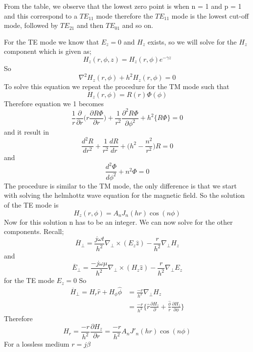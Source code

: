 From the table, we observe that the lowest zero point is when n = 1 and p = 1 and this correspond to a $TE_{11}$ mode therefore the $TE_{11}$ mode is the lowest cut-off mode, followed by $TE_{21}$ and then $TE_{01}$ and so on.

For the TE mode we know that $E_z = 0$ and $H_z$ exists, so we will solve for the $H_z$   component which is given as;
$$H_z(r,\phi,z) = H_z(r,\phi)e^{-\gamma z}$$ So \begin{equation} \nabla^2 H_z(r,\phi) +  h^2 H_z(r,\phi) = 0\end{equation}
To solve this equation we repeat the procedure for the TM mode such that 
$$H_z(r,\phi)= R(r)\Phi(\phi)$$
Therefore equation we 1 becomes
$$ \frac{1}{r}\frac{\partial}{\partial r}\bigg(r\frac{\partial R\Phi}{\partial r}\bigg) + \frac{1}{r^2}\frac{\partial^2 R\Phi}{\partial \phi^2} + h^2\{R\Phi\} = 0$$
and it result in
\begin{equation}
\dfrac{d^2 R}{dr^2} + \frac{1}{r^2}\dfrac{dR}{dr} + \bigg(h^2 - \frac{n^2}{r^2}\bigg)R = 0
\end{equation}
and 
\begin{equation}
\dfrac{d^2\Phi}{d\phi^2} + n^2\Phi = 0
\end{equation}
The procedure is similar to the TM mode, the only difference is that we start with solving  the helmhottz wave equation for the magnetic field.
So the solution of the TE mode is 
$$ H_z(r,\phi) = A_nJ_n(hr)\cos(n\phi)$$
Now for this solution n has to be an integer. We can now solve for the other components. Recall;
$$ \overline{H}_\perp = \frac{j\omega t}{h^2}\nabla_\perp\times(E_z\hat{z}) - \frac{r}{h^2}\nabla_\perp H_z$$ and
$$\overline{E}_\perp = \frac{-j\omega \mu}{h^2}\nabla_\perp\times(H_z\hat{z}) - \frac{r}{h^2}\nabla_\perp E_z$$
for the TE mode $E_z = 0$ So 
\begin{align} 
\overline{H}_\perp = H_r \hat{r} + H_\phi \hat{\phi} &= \frac{-r}{h^2}\nabla_\perp H_z\\
&= \frac{-r}{h^2}\bigg\{ 
\hat{r}\frac{\partial H_z}{\partial} + \frac{\hat{\phi}}{r} \frac{\partial H_z}{\partial \phi}   
\bigg\}
\end{align}
Therefore
$$H_r = \frac{-r}{h^2}\frac{\partial H_z}{\partial r} =  \frac{-r}{h^2}A_nJ'_n(hr)\cos(n\phi)$$
For a lossless medium $ r =j\beta$

